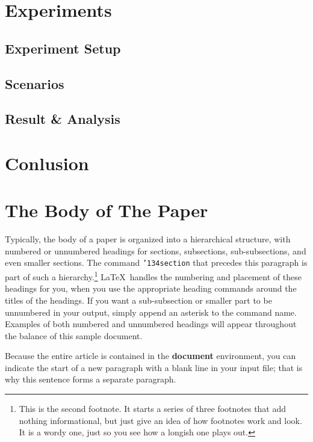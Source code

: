 \documentclass{sig-alternate}
\begin{document}
\section{Experiments}
\subsection{Experiment Setup}
\subsection{Scenarios}
\subsection{Result \& Analysis}



\section{Conlusion}


 

\section{The {\secit Body} of The Paper}
Typically, the body of a paper is organized
into a hierarchical structure, with numbered or unnumbered
headings for sections, subsections, sub-subsections, and even
smaller sections.  The command \texttt{{\char'134}section} that
precedes this paragraph is part of such a
hierarchy.\footnote{This is the second footnote.  It
starts a series of three footnotes that add nothing
informational, but just give an idea of how footnotes work
and look. It is a wordy one, just so you see
how a longish one plays out.} \LaTeX\ handles the numbering
and placement of these headings for you, when you use
the appropriate heading commands around the titles
of the headings.  If you want a sub-subsection or
smaller part to be unnumbered in your output, simply append an
asterisk to the command name.  Examples of both
numbered and unnumbered headings will appear throughout the
balance of this sample document.

Because the entire article is contained in
the \textbf{document} environment, you can indicate the
start of a new paragraph with a blank line in your
input file; that is why this sentence forms a separate paragraph.
\end{document}

